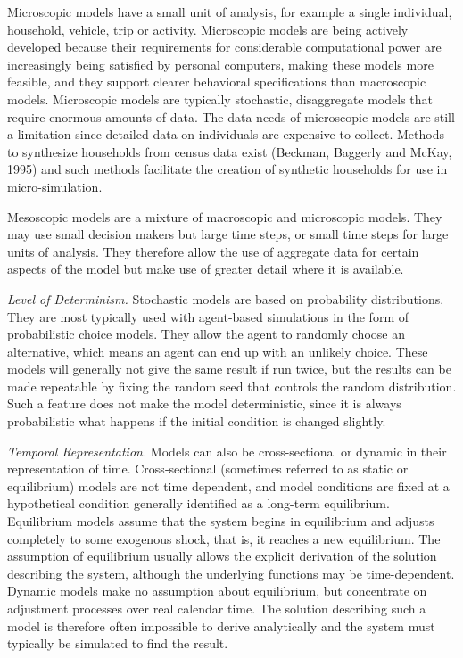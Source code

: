 Microscopic models have a small unit of analysis, for example a single individual, household, vehicle, trip or activity. Microscopic models are being actively developed because their requirements for considerable computational power are increasingly being satisfied by personal computers, making these models more feasible, and they support clearer behavioral specifications than macroscopic models. Microscopic models are typically stochastic, disaggregate models that require enormous amounts of data. The data needs of microscopic models are still a limitation since detailed data on individuals are expensive to collect. Methods to synthesize households from census data exist (Beckman, Baggerly and McKay, 1995) and such methods facilitate the creation of synthetic households for use in micro-simulation.

Mesoscopic models are a mixture of macroscopic and microscopic models. They may use small decision makers but large time steps, or small time steps for large units of analysis. They therefore allow the use of aggregate data for certain aspects of the model but make use of greater detail where it is available.

\emph{Level of Determinism.}      Stochastic models are based on probability distributions. They are most typically used with agent-based simulations in the form of probabilistic choice models. They allow the agent to randomly choose an alternative, which means an agent can end up with an unlikely choice. These models will generally not give the same result if run twice, but the results can be made repeatable by fixing the random seed that controls the random distribution. Such a feature does not make the model deterministic, since it is always probabilistic what happens if the initial condition is changed slightly.

\emph{Temporal Representation.}  Models can also be cross-sectional or dynamic in their representation of time. Cross-sectional (sometimes referred to as static or equilibrium) models are not time dependent, and model conditions are fixed at a hypothetical condition generally identified as a long-term equilibrium. Equilibrium models assume that the system begins in equilibrium and adjusts completely to some exogenous shock, that is, it reaches a new equilibrium. The assumption of equilibrium usually allows the explicit derivation of the solution describing the system, although the underlying functions may be time-dependent. Dynamic models make no assumption about equilibrium, but concentrate on adjustment processes over real calendar time. The solution describing such a model is therefore often impossible to derive analytically and the system must typically be simulated to find the result.

